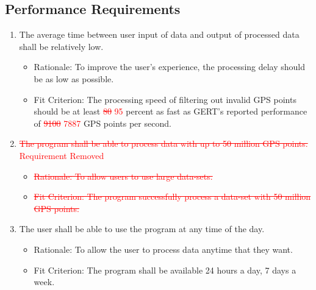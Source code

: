 \documentclass[12pt, titlepage]{article}
\begin{document}
\subsection{Performance Requirements}
\begin{enumerate}[{PR}1. ]
\item \label{PR1} The average time between user input of data and output of processed data shall be relatively low.
    \begin{itemize} 
        \item Rationale: To improve the user's experience, the processing delay should be as low as possible.
        \item Fit Criterion: The processing speed of filtering out invalid GPS points should be at least \textcolor{red}{\sout{80} 95} percent as fast as GERT's reported performance of \textcolor{red}{\sout{9100} 7887} GPS points per second.
    \end{itemize} 
    
\item \label{PR2} \textcolor{red}{\sout{The program shall be able to process data with up to 50 million GPS points.} Requirement Removed}
    \begin{itemize} 
        \item \textcolor{red}{\sout{Rationale: To allow users to use large data-sets.}}
        \item \textcolor{red}{\sout{Fit Criterion: The program successfully process a data-set with 50 million GPS points.}}
    \end{itemize}

\item \label{PR3} The user shall be able to use the program at any time of the day.
    \begin{itemize} 
        \item Rationale: To allow the user to process data anytime that they want.
        \item Fit Criterion: The program shall be available 24 hours a day, 7 days a week.
    \end{itemize} 

\end{enumerate}
\end{document}
